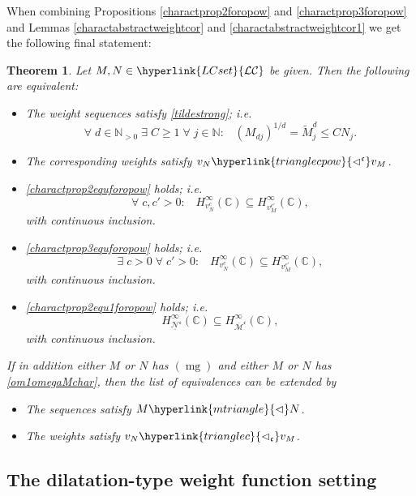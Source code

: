 \documentclass[10pt]{amsart}%
\numberwithin{equation}{section}
\theoremstyle{plain}
\newtheorem{theorem}[proposition]{Theorem}
\newcommand{\CC}{\mathbb{C}}
\newcommand{\NN}{\mathbb{N}}
\let\on=\operatorname
\begin{document}
When combining Propositions \ref{charactprop2foropow} and \ref{charactprop3foropow} and Lemmas \ref{charactabstractweightcor} and \ref{charactabstractweightcor1} we get the following final statement:

\begin{theorem}\label{littleoweightsequcharactpow}
	Let $M,N\in\hyperlink{LCset}{\mathcal{LC}}$ be given. Then the following are equivalent:
	
	\begin{itemize}
		\item[$(i)$] The weight sequences satisfy \eqref{tildestrong}; i.e.
		$$\forall\;d\in\NN_{>0}\;\exists\;C\ge 1\;\forall\;j\in\NN:\;\;\;(M_{dj})^{1/d}=\widetilde{M}^d_j\le CN_j.$$
		
		\item[$(ii)$] The corresponding weights satisfy $v_N\hyperlink{trianglecpow}{\vartriangleleft^{\mathfrak{c}}}v_M$.
		
		\item[$(iii)$] \eqref{charactprop2equforopow} holds; i.e.
		$$\forall\;c,c'>0:\;\;\;H^{\infty}_{v^c_N}(\CC)\subseteq H^{\infty}_{v^{c'}_M}(\CC),$$
		with continuous inclusion.
		
		\item[$(iv)$] \eqref{charactprop3equforopow} holds; i.e.
		$$\exists\;c>0\;\forall\;c'>0:\;\;\;H^{\infty}_{v^c_N}(\CC)\subseteq H^{\infty}_{v^{c'}_M}(\CC),$$
		with continuous inclusion.
		
		\item[$(v)$] \eqref{charactprop2equ1foropow} holds; i.e.
		$$H^{\infty}_{\underline{\mathcal{N}}^{\mathfrak{c}}}(\CC)\subseteq H^{\infty}_{\overline{\mathcal{M}}^{\mathfrak{c}}}(\CC),$$
		with continuous inclusion.
	\end{itemize}
	If in addition either $M$ or $N$ has \hyperlink{mg}{$(\on{mg})$} and either $M$ or $N$ has \eqref{om1omegaMchar}, then the list of equivalences can be extended by
	\begin{itemize}
		\item[$(vi)$] The sequences satisfy $M\hyperlink{mtriangle}{\vartriangleleft}N$.
		
		\item[$(vii)$] The weights satisfy $v_N\hyperlink{trianglec}{\vartriangleleft_{\mathfrak{c}}}v_M$.
	\end{itemize}
\end{theorem}

\subsection{The dilatation-type weight function setting}
\end{document}
